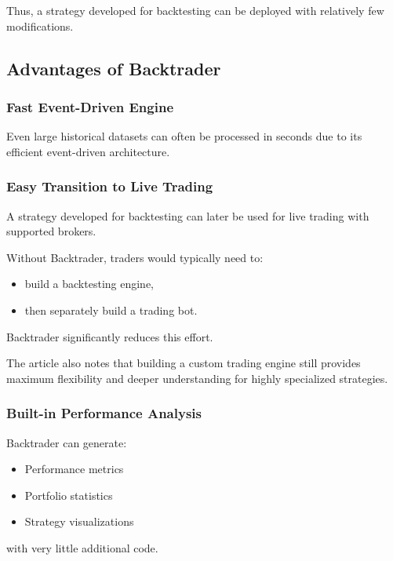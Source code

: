 \documentclass[12pt,openany]{book}
\begin{document}
Thus, a strategy developed for backtesting can be deployed with relatively few modifications.

\subsection{Advantages of Backtrader}

\subsubsection{Fast Event-Driven Engine}

Even large historical datasets can often be processed in seconds due to its efficient event-driven architecture.

\subsubsection{Easy Transition to Live Trading}

A strategy developed for backtesting can later be used for live trading with supported brokers.

Without Backtrader, traders would typically need to:

\begin{itemize}[leftmargin=*]
    \item build a backtesting engine,
    \item then separately build a trading bot.
\end{itemize}

Backtrader significantly reduces this effort.

The article also notes that building a custom trading engine still provides maximum flexibility and deeper understanding for highly specialized strategies.

\subsubsection{Built-in Performance Analysis}

Backtrader can generate:

\begin{itemize}[leftmargin=*]
    \item Performance metrics
    \item Portfolio statistics
    \item Strategy visualizations
\end{itemize}

with very little additional code.
\end{document}
